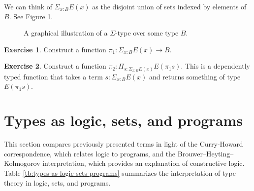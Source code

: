 \documentclass{amsart}
\theoremstyle{definition}
\newtheorem{ex}{Exercise}[section]
\begin{document}
We can think of $\Sigma_{x : B}E(x)$ as the disjoint union of sets indexed by elements of $B$.
See Figure \ref{fig:sigma-type-as-total-space}.
\begin{figure}[h]
    \centering
    
    \caption{A graphical illustration of a $\Sigma$-type over some type $B$.}
    \label{fig:sigma-type-as-total-space}
\end{figure}

\begin{ex}
Construct a function $\pi_1 : \Sigma_{x : B} E(x) \to B$.
\end{ex}

\begin{ex}
Construct a function $\pi_2 : \Pi_{s : \Sigma_{x : B} E(x)} E(\pi_1 s)$. This is a dependently typed function that takes a term $s : \Sigma_{x : B} E(x)$ and returns something of type $E(\pi_1 s)$.
\end{ex}

\section{Types as logic, sets, and programs}
This section compares previously presented terms in light of the Curry-Howard correspondence, which relates logic to programs, and the Brouwer–Heyting–Kolmogorov interpretation, which provides an explanation of constructive logic. 
Table \ref{tb:types-as-logic-sets-programs} summarizes the interpretation of type theory in logic, sets, and programs.
\end{document}
